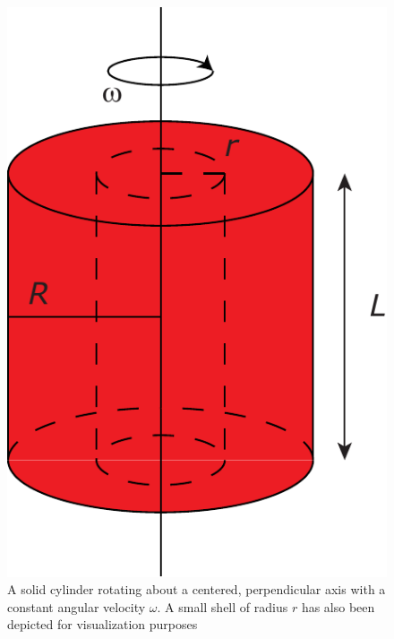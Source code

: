 \begin{figure}[H]
  \centering
  \includegraphics[width=0.25\linewidth]{fig/images/rotating_solid_cylinder.pdf}
  \caption{A solid cylinder rotating about a centered, perpendicular axis with a constant angular velocity $\omega$. A small shell of radius $r$ has also been depicted for visualization purposes}
  \label{fig:rotating_solid_cylinder}
\end{figure}